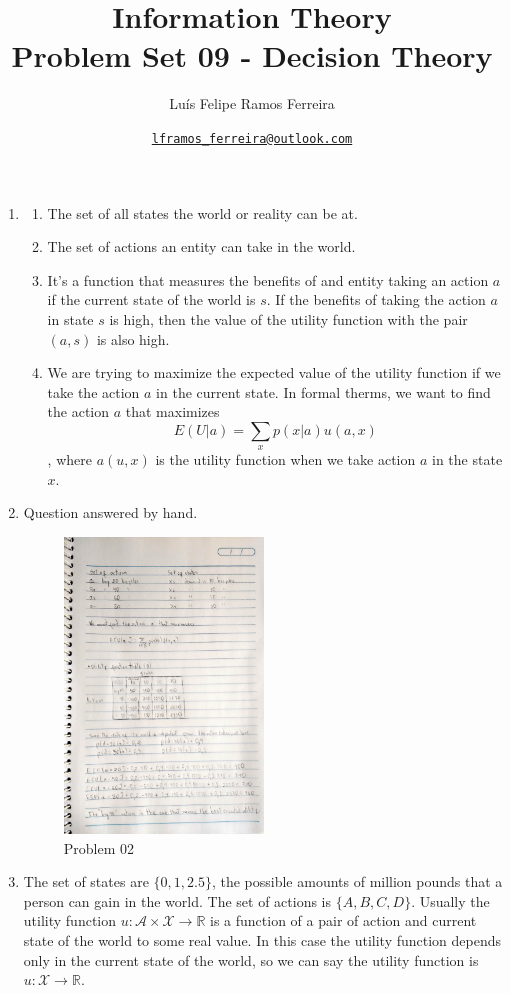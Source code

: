 \documentclass{article}
\title{Information Theory \\ \large Problem Set 09 - Decision Theory}
\author{Luís Felipe Ramos Ferreira}
\date{\href{mailto:lframos\_ferreira@outlook.com}{\texttt{lframos\_ferreira@outlook.com}}
}
\begin{document}
\maketitle

\begin{enumerate}
	\item \begin{enumerate}
		      \item The set of all states the world or reality can be at.
		      \item The set of actions an entity can take in the world.
		      \item It's a function that measures the benefits of and entity taking an action \(a\) if the current state of the world is \(s\). If the benefits of taking the action \(a\) in state \(s\) is high, then the value of the utility function
		            with the pair \((a, s)\) is also high.
		      \item We are trying to maximize the expected value of the utility function if we take the action \(a\) in the current state. In formal therms, we want to find the action \(a\) that maximizes
		            \[E(U | a) = \sum_x p(x | a)u(a, x)\],
		            where \(a(u, x)\) is the utility function when we take action \(a\) in the state \(x\).
	      \end{enumerate}
	\item Question answered by hand.
	      \begin{figure}[H]
		      \centering
		      \includegraphics[width=0.5\textwidth]{images/02.jpeg}
		      \caption{Problem 02}
	      \end{figure}
	\item The set of states are \(\{0, 1, 2.5\}\), the possible amounts of million pounds that a person can gain in the world.
	      The set of actions is \(\{A, B, C, D\}\). Usually the utility function \(u: \mathcal{A} \times \mathcal{X} \rightarrow \mathbb{R}\)
	      is a function of a pair of action and current state of the world to some real value. In this case the utility function depends only in the current state of the world,
	      so we can say the utility function is \(u: \mathcal{X} \rightarrow \mathbb{R}\).


\end{enumerate}
\end{document}
